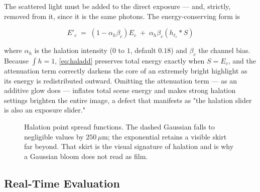 The scattered light must be added to the direct exposure --- and, strictly,
removed from it, since it is the same photons. The energy-conserving form is

\begin{equation}
\boxed{\;E'_c \;=\; \left(1 - \alpha_h \beta_c\right) E_c \;+\; \alpha_h \beta_c \left(h_{\ell_c} * S\right)\;}
\label{eq:haladd}
\end{equation}

where $\alpha_h$ is the halation intensity ($0$ to $1$, default $0.18$) and
$\beta_c$ the channel bias. Because $\int h = 1$, \eqref{eq:haladd} preserves
total energy exactly when $S = E_c$, and the attenuation term correctly darkens
the core of an extremely bright highlight as its energy is redistributed
outward. Omitting the attenuation term --- as an additive glow does --- inflates
total scene energy and makes strong halation settings brighten the entire image,
a defect that manifests as "the halation slider is also an exposure slider."

\begin{figure}[htbp]
\centering
{}
\caption{Halation point spread functions. The dashed Gaussian falls to negligible values by $250\,\mu$m; the exponential retains a visible skirt far beyond. That skirt is the visual signature of halation and is why a Gaussian bloom does not read as film.}
\label{fig:halpsf}
\end{figure}

\subsection{Real-Time Evaluation}
\label{sec:recursive-blur}

